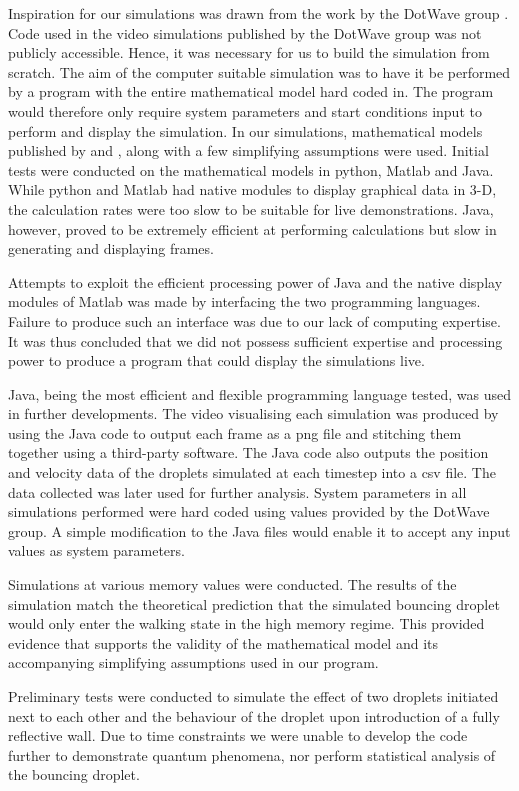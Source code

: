 Inspiration for our simulations was drawn from the work by the DotWave group \cite{dotwave}. Code used in the video simulations published by the DotWave group was not publicly accessible. Hence, it was necessary for us to build the simulation from scratch. The aim of the computer suitable simulation was to have it be performed by a program with the entire mathematical model hard coded in. The program would therefore only require system parameters and start conditions input to perform and display the simulation.
In our simulations, mathematical models published by \cite{oza2013trajectory} and \cite{brady2014bouncing}, along with a few simplifying assumptions were used. Initial tests were conducted on the mathematical models in python, Matlab and Java. While python and Matlab had native modules to display graphical data in 3-D, the calculation rates were too slow to be suitable for live demonstrations. Java, however, proved to be extremely efficient at performing calculations but slow in generating and displaying frames. 

Attempts to exploit the efficient processing power of Java and the native display modules of Matlab was made by interfacing the two programming languages. Failure to produce such an interface was due to our lack of computing expertise. It was thus concluded that we did not possess sufficient expertise and processing power to produce a program that could display the simulations live.

Java, being the most efficient and flexible programming language tested, was used in further developments. The video visualising each simulation was produced by using the Java code to output each frame as a png file and stitching them together using a third-party software. The Java code also outputs the position and velocity data of the droplets simulated at each timestep into a csv file. The data collected was later used for further analysis. System parameters in all simulations performed were hard coded using values provided by the DotWave group. A simple modification to the Java files would enable it to accept any input values as system parameters.

Simulations at various memory values were conducted. The results of the simulation match the theoretical prediction that the simulated bouncing droplet would only enter the walking state in the high memory regime. This provided evidence that supports the validity of the mathematical model and its accompanying simplifying assumptions used in our program.

Preliminary tests were conducted to simulate the effect of two droplets initiated next to each other and the behaviour of the droplet upon introduction of a fully reflective wall. Due to time constraints we were unable to develop the code further to demonstrate quantum phenomena, nor perform statistical analysis of the bouncing droplet. 
